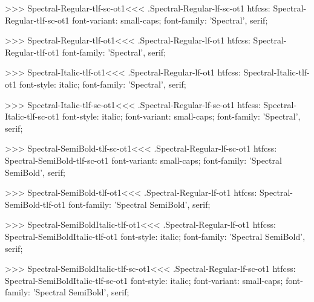 >>>
\<Spectral-Regular-tlf-sc-ot1\><<<
.Spectral-Regular-lf-sc-ot1
htfcss:  Spectral-Regular-tlf-sc-ot1  font-variant: small-caps; font-family: 'Spectral', serif;

>>>
\<Spectral-Regular-tlf-ot1\><<<
.Spectral-Regular-lf-ot1
htfcss:  Spectral-Regular-tlf-ot1  font-family: 'Spectral', serif;

>>>
\<Spectral-Italic-tlf-ot1\><<<
.Spectral-Regular-lf-ot1
htfcss:  Spectral-Italic-tlf-ot1  font-style: italic; font-family: 'Spectral', serif;

>>>
\<Spectral-Italic-tlf-sc-ot1\><<<
.Spectral-Regular-lf-sc-ot1
htfcss:  Spectral-Italic-tlf-sc-ot1  font-style: italic; font-variant: small-caps; font-family: 'Spectral', serif;

>>>
\<Spectral-SemiBold-tlf-sc-ot1\><<<
.Spectral-Regular-lf-sc-ot1
htfcss:  Spectral-SemiBold-tlf-sc-ot1  font-variant: small-caps; font-family: 'Spectral SemiBold', serif;

>>>
\<Spectral-SemiBold-tlf-ot1\><<<
.Spectral-Regular-lf-ot1
htfcss:  Spectral-SemiBold-tlf-ot1  font-family: 'Spectral SemiBold', serif;

>>>
\<Spectral-SemiBoldItalic-tlf-ot1\><<<
.Spectral-Regular-lf-ot1
htfcss:  Spectral-SemiBoldItalic-tlf-ot1  font-style: italic; font-family: 'Spectral SemiBold', serif;

>>>
\<Spectral-SemiBoldItalic-tlf-sc-ot1\><<<
.Spectral-Regular-lf-sc-ot1
htfcss:  Spectral-SemiBoldItalic-tlf-sc-ot1  font-style: italic; font-variant: small-caps; font-family: 'Spectral SemiBold', serif;

